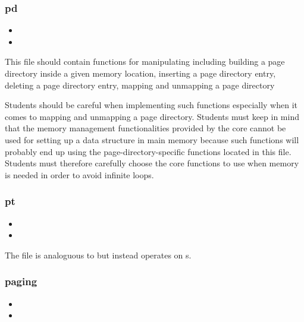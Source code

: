 \subsubsection*{pd}

\begin{itemize}
  \item
  \item
\end{itemize}

This file should contain functions for manipulating  including building a page directory inside a given memory
location, inserting a page directory entry, deleting a page directory
entry, mapping and unmapping a page directory \etc{}

Students should be careful when implementing such functions especially when
it comes to mapping and unmapping a page directory. Students must keep
in mind that the memory management functionalities provided by the core
cannot be used for setting up a data structure in main memory because such
functions will probably end up using the page-directory-specific functions
located in this file. Students must therefore carefully choose the core
functions to use when memory is needed in order to avoid infinite loops.

\subsubsection*{pt}

\begin{itemize}
  \item
  \item
\end{itemize}

The file  is analoguous to  but instead operates
on s.

\subsubsection*{paging}

\begin{itemize}
  \item
  \item
\end{itemize}

